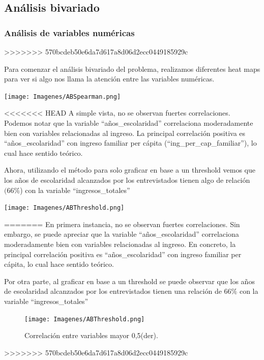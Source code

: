 \documentclass[a4paper]{article}
\begin{document}
    \subsection{Análisis bivariado}

        \subsubsection{Análisis de variables numéricas}
>>>>>>> 570bcdeb50e6da7d617a8d06d2ecc0449185929c
 
        Para comenzar el análisis bivariado del problema, realizamos diferentes heat maps para ver si algo nos llama la atención entre las variables numéricas.        
       
        \begin{center}
            \texttt{[image: Imagenes/ABSpearman.png]}
        \end{center}
 
<<<<<<< HEAD
        A simple vista, no se observan fuertes correlaciones. Podemos notar que la variable ``años\_escolaridad'' correlaciona moderadamente bien con variables relacionadas al ingreso. La principal correlación positiva es ``años\_escolaridad'' con ingreso familiar per cápita (``ing\_per\_cap\_familiar''), lo cual hace sentido teórico.
 
        Ahora, utilizando el método para solo graficar en base a un threshold vemos que los años de escolaridad alcanzados por los entrevistados tienen algo de relación $(66\%$) con la variable ``ingresos\_totales''

        \begin{center}
            \texttt{[image: Imagenes/ABThreshold.png]}
        \end{center}
=======
        En primera instancia, no se observan fuertes correlaciones. Sin embargo, se puede apreciar que la variable ``años\_escolaridad'' correlaciona moderadamente bien con variables relacionadas al ingreso. En concreto, la principal correlación positiva es ``años\_escolaridad'' con ingreso familiar per cápita, lo cual hace sentido teórico.
        
        Por otra parte, al graficar en base a un threshold se puede observar que los años de escolaridad alcanzados por los entrevistados tienen una relación de $66\%$ con la variable ``ingresos\_totales''

        \begin{figure}[H]
            \centering
            \texttt{[image: Imagenes/ABThreshold.png]}
            \caption{Correlación entre variables mayor 0,5(der).}
            \label{AB Treshold Correlation}
        \end{figure}
>>>>>>> 570bcdeb50e6da7d617a8d06d2ecc0449185929c
 
\end{document}
